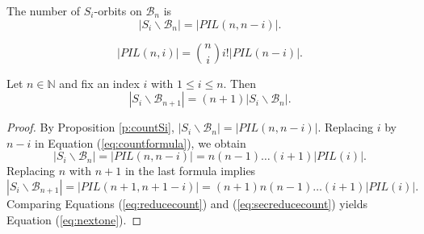 \documentclass[10pt,a4paper]{amsart}
\newcommand{\B}{\mathcal{B}}
\begin{document}
\begin{prop}\label{p:countSi}
The number of $S_{i}$-orbits on $\B_{n}$ is 
\begin{equation}\label{eq:countSi}
|S_{i}\backslash\B_{n}|=|PIL(n,n-i)|. 
\end{equation}
\end{prop}

\begin{equation}\label{eq:countformula}
|PIL(n,i)|={n\choose i} i! |PIL(n-i)|.
\end{equation}

\begin{prop}\label{p:nextone}
Let $n\in\mathbb{N}$ and fix an index $i$ with $1\leq i\leq n$.  Then 
\begin{equation}\label{eq:nextone}
|S_{i}\backslash\B_{n+1}|=(n+1) |S_{i}\backslash \B_{n}|.
\end{equation}
\end{prop}

\begin{proof}
By Proposition \ref{p:countSi}, $|S_{i}\backslash \B_{n}|=|PIL(n,n-i)|$.  Replacing 
$i$ by $n-i$ in Equation (\ref{eq:countformula}), we obtain 
\begin{equation}\label{eq:reducecount}
|S_{i}\backslash \B_{n}|=|PIL(n,n-i)|=n(n-1)\dots (i+1) |PIL(i)|.
\end{equation}
Replacing $n$ with $n+1$ in the last formula implies
\begin{equation}\label{eq:secreducecount}
|S_{i}\backslash\B_{n+1}|=|PIL(n+1,n+1-i)|=(n+1)n(n-1)\dots (i+1) |PIL(i)|.
\end{equation}
Comparing Equations (\ref{eq:reducecount}) and (\ref{eq:secreducecount}) yields 
Equation (\ref{eq:nextone}).



\end{proof}
\end{document}
